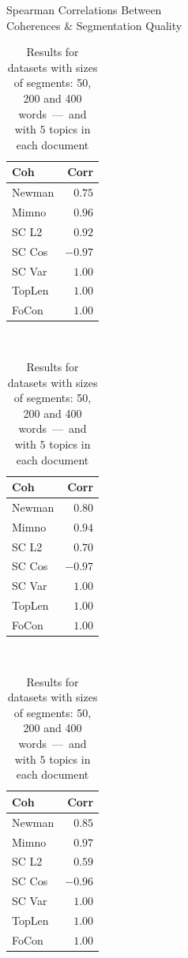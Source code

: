 \documentclass[russian]{beamer}
\begin{document}
\begin{frame}{Spearman Correlations Between\\Coherences \& Segmentation Quality}
  \begin{table}[t]
    \begin{tabular}{lr}
      Coh & Corr\\
      \toprule
      Newman & $0.75$\\
      Mimno & $0.96$\\
      \midrule
      SC L2 & $0.92$\\
      SC Cos & $-0.97$\\
      SC Var & $\mathbf{1.00}$\\
      TopLen & $\mathbf{1.00}$\\
      FoCon & $\mathbf{1.00}$\\
      \bottomrule
    \end{tabular}
    ~
    \begin{tabular}{lr}
      Coh & Corr\\
      \toprule
      Newman & $0.80$\\
      Mimno & $0.94$\\
      \midrule
      SC L2 & $0.70$\\
      SC Cos & $-0.97$\\
      SC Var & $\mathbf{1.00}$\\
      TopLen & $\mathbf{1.00}$\\
      FoCon & $\mathbf{1.00}$\\
      \bottomrule
    \end{tabular}
    ~
    \begin{tabular}{lr}
      Coh & Corr\\
      \toprule
      Newman & $0.85$\\
      Mimno & $0.97$\\
      \midrule
      SC L2 & $0.59$\\
      SC Cos & $-0.96$\\
      SC Var & $\mathbf{1.00}$\\
      TopLen & $\mathbf{1.00}$\\
      FoCon & $\mathbf{1.00}$\\
      \bottomrule
    \end{tabular}
    \centering
    \captionsetup{justification=centering}
    \caption*{
      Results for datasets with sizes of segments: 50, 200 and 400 words~---~and with $5$ topics in each document}
  \end{table}
\end{frame}
\end{document}
